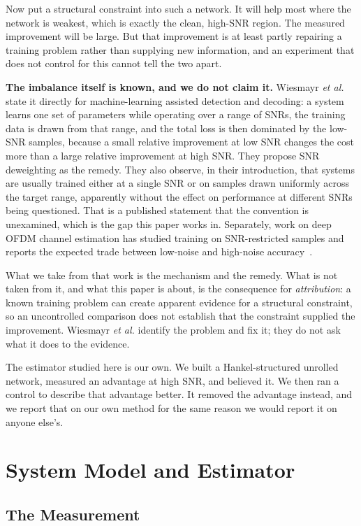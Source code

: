 \documentclass[journal]{IEEEtran}
\begin{document}
Now put a structural constraint into such a network. It will help most where
the network is weakest, which is exactly the clean, high-SNR region. The
measured improvement will be large. But that improvement is at least partly
repairing a training problem rather than supplying new information, and an
experiment that does not control for this cannot tell the two apart.

\textbf{The imbalance itself is known, and we do not claim it.} Wiesmayr
\emph{et al.}~\cite{wiesmayr2023bler} state it directly for machine-learning
assisted detection and decoding: a system learns one set of parameters while
operating over a range of SNRs, the training data is drawn from that range, and
the total loss is then dominated by the low-SNR samples, because a small
relative improvement at low SNR changes the cost more than a large relative
improvement at high SNR. They propose SNR deweighting as the remedy. They also
observe, in their introduction, that systems are usually trained either at a
single SNR or on samples drawn uniformly across the target range, apparently
without the effect on performance at different SNRs being questioned. That is a
published statement that the convention is unexamined, which is the gap this
paper works in. Separately, work on deep OFDM channel estimation has studied
training on SNR-restricted samples and reports the expected trade between
low-noise and high-noise accuracy~\cite{jameel2024ofdm}.

What we take from that work is the mechanism and the remedy. What is not taken
from it, and what this paper is about, is the consequence for
\emph{attribution}: a known training problem can create apparent evidence for a
structural constraint, so an uncontrolled comparison does not establish that
the constraint supplied the improvement. Wiesmayr \emph{et al.} identify the
problem and fix it; they do not ask what it does to the evidence.

The estimator studied here is our own. We built a Hankel-structured unrolled
network, measured an advantage at high SNR, and believed it. We then ran a
control to describe that advantage better. It removed the advantage instead,
and we report that on our own method for the same reason we would report it on
anyone else's.

\section{System Model and Estimator}

\subsection{The Measurement}
\end{document}
